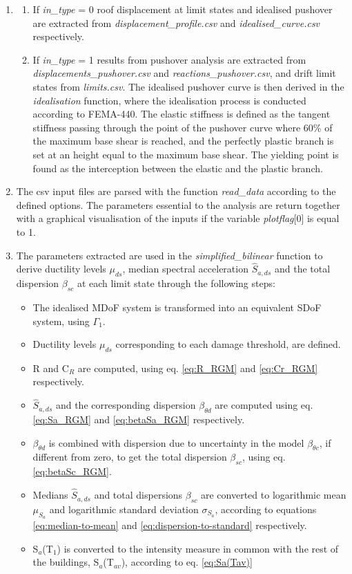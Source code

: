 \begin{enumerate}
\item
\begin{enumerate}
\item If \textit{in\_type} = 0 roof displacement at limit states and idealised pushover are extracted from \textit{displacement\_profile.csv} and \textit{idealised\_curve.csv} respectively.
\item If \textit{in\_type} = 1 results from pushover analysis are extracted from \textit{displacements\_pushover.csv} and \textit{reactions\_pushover.csv}, and drift limit states from \textit{limits.csv}. The idealised 	pushover curve is then derived in the \textit{idealisation} function, where the idealisation process is conducted according to FEMA-440. The elastic stiffness is defined as the 	tangent stiffness passing through the point of the pushover curve where 60\% of the maximum base shear is reached, and the perfectly plastic branch is set at an height equal to 	the maximum base shear. The yielding point is found as the interception between the elastic and the plastic branch.
\end{enumerate}

\item The csv input files are parsed with the function \textit{read\_data} according to the defined options. The parameters essential to the analysis are return together with a graphical visualisation of the inputs if the variable \textit{plotflag}[0] is equal to 1.

\item The parameters extracted are used in the \textit{simplified\_bilinear} function to derive ductility levels $\mu_{ds}$, median spectral acceleration $\hat{S}_{a,ds}$ and the total dispersion $\beta_{sc}$ at each limit state through the following steps:
\begin{itemize}
\item The idealised MDoF system is transformed into an equivalent SDoF system, using $\Gamma_1$.
\item Ductility levels $\mu_{ds}$ corresponding to each damage threshold, are defined.
\item R and C$_R$ are computed, using eq. \ref{eq:R_RGM} and \ref{eq:Cr_RGM} respectively.
\item $\hat{S}_{a,ds}$ and the corresponding dispersion  $\beta_{\theta d}$ are computed using eq. \ref{eq:Sa_RGM} and \ref{eq:betaSa_RGM} respectively.
\item $\beta_{\theta d}$ is combined with dispersion due to uncertainty in the model $\beta_{\theta c}$, if different from zero, to get the total dispersion $\beta_{sc}$, using eq. \ref{eq:betaSc_RGM}.
\item Medians $\hat{S}_{a,ds}$ and total dispersions $\beta_{sc}$ are converted to logarithmic mean $\mu_{S_a}$ and logarithmic standard deviation $\sigma_{S_a}$, according to equations \ref{eq:median-to-mean} and \ref{eq:dispersion-to-standard} respectively.
\item S$_a$(T$_1$) is converted to the intensity measure in common with the rest of the buildings, S$_a$(T$_{av}$), according to eq. \ref{eq:Sa(Tav)}
\end{itemize}


\end{enumerate}
